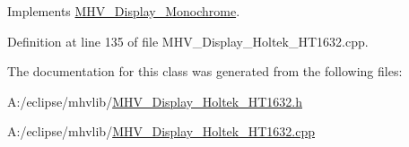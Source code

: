 \-Implements \hyperlink{class_m_h_v___display___monochrome_a58a17e8662802e7f5d6ccd6f0bcc51a0}{\-M\-H\-V\-\_\-\-Display\-\_\-\-Monochrome}.



\-Definition at line 135 of file \-M\-H\-V\-\_\-\-Display\-\_\-\-Holtek\-\_\-\-H\-T1632.\-cpp.



\-The documentation for this class was generated from the following files\-:\begin{DoxyCompactItemize}
\item 
\-A\-:/eclipse/mhvlib/\hyperlink{_m_h_v___display___holtek___h_t1632_8h}{\-M\-H\-V\-\_\-\-Display\-\_\-\-Holtek\-\_\-\-H\-T1632.\-h}\item 
\-A\-:/eclipse/mhvlib/\hyperlink{_m_h_v___display___holtek___h_t1632_8cpp}{\-M\-H\-V\-\_\-\-Display\-\_\-\-Holtek\-\_\-\-H\-T1632.\-cpp}\end{DoxyCompactItemize}
